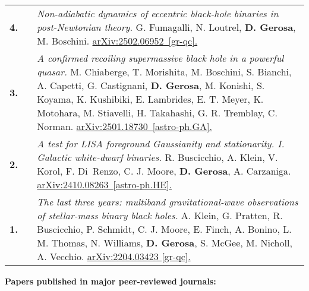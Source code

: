 {\begin{longtable}{rp{0.3cm}p{15.8cm}}
%
\textbf{4.} & & \textit{Non-adiabatic dynamics of eccentric black-hole binaries in post-Newtonian theory.}
\newline{}
G. Fumagalli, N. Loutrel, \textbf{D. Gerosa}, M. Boschini.
\newline{}
\href{https://arxiv.org/abs/2502.06952}{arXiv:2502.06952 [gr-qc].}
\vspace{0.09cm}\\
%
\textbf{3.} & & \textit{A confirmed recoiling supermassive black hole in a powerful quasar.}
\newline{}
M. Chiaberge, T. Morishita, M. Boschini, S. Bianchi, A. Capetti, G. Castignani, \textbf{D. Gerosa}, M. Konishi, S. Koyama, K. Kushibiki, E. Lambrides, E. T. Meyer, K. Motohara, M. Stiavelli, H. Takahashi, G. R. Tremblay, C. Norman.
\newline{}
\href{https://arxiv.org/abs/2501.18730}{arXiv:2501.18730 [astro-ph.GA].}
\vspace{0.09cm}\\
%
\textbf{2.} & & \textit{A test for LISA foreground Gaussianity and stationarity. I. Galactic white-dwarf binaries.}
\newline{}
R. Buscicchio, A. Klein, V. Korol, F. Di Renzo, C. J. Moore, \textbf{D. Gerosa}, A. Carzaniga.
\newline{}
\href{https://arxiv.org/abs/2410.08263}{arXiv:2410.08263 [astro-ph.HE].}
\vspace{0.09cm}\\
%
\textbf{1.} & & \textit{The last three years: multiband gravitational-wave observations of stellar-mass binary black holes.}
\newline{}
A. Klein, G. Pratten, R. Buscicchio, P. Schmidt, C. J. Moore, E. Finch, A. Bonino, L. M. Thomas, N. Williams, \textbf{D. Gerosa}, S. McGee, M. Nicholl, A. Vecchio.
\newline{}
\href{https://arxiv.org/abs/2204.03423}{arXiv:2204.03423 [gr-qc].}
\vspace{0.09cm}\\
%
\end{longtable} }
\textcolor{color1}{\textbf{Papers published in major peer-reviewed journals:}}
\vspace{-0.5cm}

